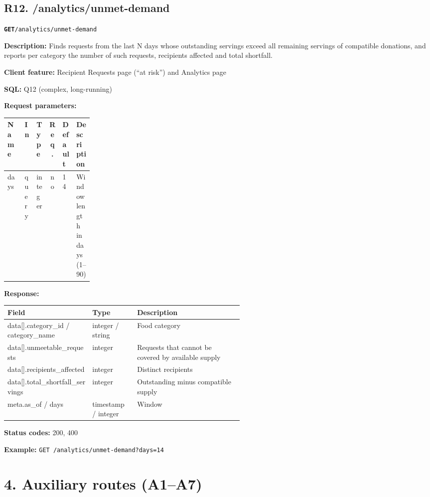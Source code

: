 \documentclass[11pt,letterpaper]{article}
\newcommand{\brk}{\penalty0\relax}
\newcommand{\routebar}[2]{%
  \par\noindent\colorbox{boxGray}{\parbox{\dimexpr\linewidth-2\fboxsep}{%
  \strut\textbf{\texttt{#1}}\quad\texttt{#2}\strut}}\par\smallskip}
\newcommand{\kv}[2]{\textbf{#1:} #2\par}
\begin{document}
\subsection*{R12. /analytics/unmet-demand}
\routebar{GET}{/analytics/unmet-demand}
\kv{Description}{Finds requests from the last N days whose outstanding servings exceed all remaining servings of compatible donations, and reports per category the number of such requests, recipients affected and total shortfall.}
\kv{Client feature}{Recipient Requests page (``at risk'') and Analytics page}
\kv{SQL}{Q12 (complex, long-running)}
\kv{Request parameters}{}
\begin{xltabular}{\linewidth}{>{\ttfamily\raggedright\arraybackslash}p{0.2\linewidth} l l c l >{\raggedright\arraybackslash}X}
\toprule
\textrm{\textbf{Name}} & \textbf{In} & \textbf{Type} & \textbf{Req.} & \textbf{Default} & \textbf{Description} \\
\midrule
days & query & integer & no & 14 & Window length in days (1--90) \\
\bottomrule
\end{xltabular}
\kv{Response}{}
\begin{xltabular}{\linewidth}{>{\ttfamily\raggedright\arraybackslash}p{0.36\linewidth} >{\raggedright\arraybackslash}p{0.19\linewidth} >{\raggedright\arraybackslash}X}
\toprule
\textrm{\textbf{Field}} & \textbf{Type} & \textbf{Description} \\
\midrule
data[].\brk{}category\_id /\brk{} category\_name & integer / string & Food category \\
data[].\brk{}unmeetable\_requests & integer & Requests that cannot be covered by available supply \\
data[].\brk{}recipients\_affected & integer & Distinct recipients \\
data[].\brk{}total\_shortfall\_servings & integer & Outstanding minus compatible supply \\
meta.\brk{}as\_of /\brk{} days & timestamp / integer & Window \\
\bottomrule
\end{xltabular}
\kv{Status codes}{200, 400}
{\raggedright\textbf{Example:} {\small \texttt{GET /\brk{}analytics/\brk{}unmet-demand?\brk{}days=\brk{}14}}\par}
\section*{4. Auxiliary routes (A1--A7)}
\end{document}
